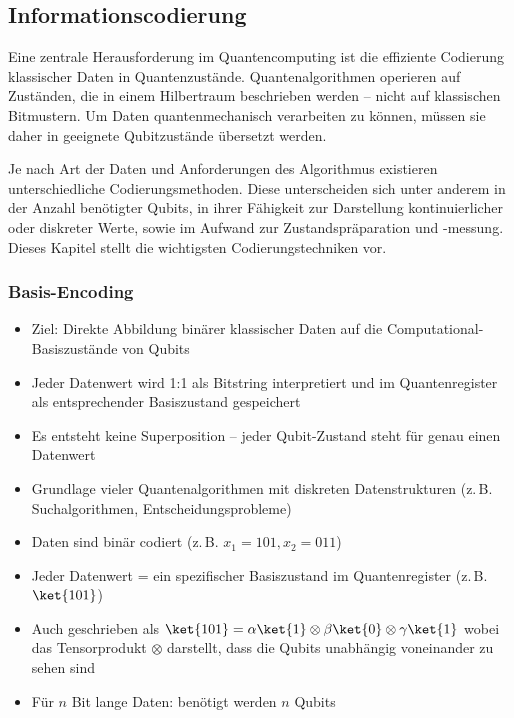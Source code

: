 \subsection{Informationscodierung}
Eine zentrale Herausforderung im Quantencomputing ist die effiziente Codierung klassischer Daten in Quantenzustände. Quantenalgorithmen operieren auf Zuständen, die in einem Hilbertraum beschrieben werden – nicht auf klassischen Bitmustern. Um Daten quantenmechanisch verarbeiten zu können, müssen sie daher in geeignete Qubitzustände übersetzt werden.

Je nach Art der Daten und Anforderungen des Algorithmus existieren unterschiedliche Codierungsmethoden. Diese unterscheiden sich unter anderem in der Anzahl benötigter Qubits, in ihrer Fähigkeit zur Darstellung kontinuierlicher oder diskreter Werte, sowie im Aufwand zur Zustandspräparation und -messung. Dieses Kapitel stellt die wichtigsten Codierungstechniken vor.

\subsubsection{Basis-Encoding}
\begin{itemize}
\item Ziel: Direkte Abbildung binärer klassischer Daten auf die Computational-Basiszustände von Qubits
\item Jeder Datenwert wird 1:1 als Bitstring interpretiert und im Quantenregister als entsprechender Basiszustand gespeichert
\item Es entsteht keine Superposition – jeder Qubit-Zustand steht für genau einen Datenwert
\item Grundlage vieler Quantenalgorithmen mit diskreten Datenstrukturen (z.\,B. Suchalgorithmen, Entscheidungsprobleme)
\item Daten sind binär codiert (z.\,B. $ x_1 = 101, x_2 = 011$)
\item Jeder Datenwert = ein spezifischer Basiszustand im Quantenregister (z.\,B. $\ket{101}$)
\item Auch geschrieben als $\ket{101} = \alpha\ket{1} \otimes \beta \ket{0} \otimes \gamma\ket{1}$ wobei das Tensorprodukt $\otimes$ darstellt, dass die Qubits unabhängig voneinander zu sehen sind
\item Für \( n \) Bit lange Daten: benötigt werden $n$ Qubits
\end{itemize}
\cite{Date encoding patterns for quantum computing}
\\

